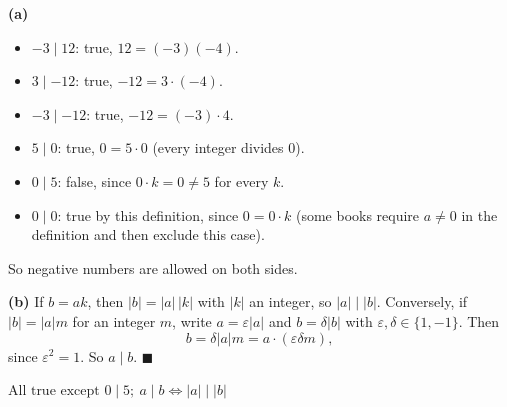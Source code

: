 \textbf{(a)}
\begin{itemize}
\item $-3\mid12$: true, $12=(-3)(-4)$.
\item $3\mid-12$: true, $-12=3\cdot(-4)$.
\item $-3\mid-12$: true, $-12=(-3)\cdot4$.
\item $5\mid0$: true, $0=5\cdot0$ (every integer divides $0$).
\item $0\mid5$: false, since $0\cdot k=0\ne5$ for every $k$.
\item $0\mid0$: true by this definition, since $0=0\cdot k$ (some books require $a\ne0$ in the definition and then exclude this case).
\end{itemize}
So negative numbers are allowed on both sides.

\textbf{(b)} If $b=ak$, then $|b|=|a|\,|k|$ with $|k|$ an integer, so $|a|\mid|b|$. Conversely, if $|b|=|a|m$ for an integer $m$, write $a=\varepsilon|a|$ and $b=\delta|b|$ with $\varepsilon,\delta\in\{1,-1\}$. Then
\[b=\delta|a|m=a\cdot(\varepsilon\delta m),\]
since $\varepsilon^2=1$. So $a\mid b$. $\blacksquare$

$\boxed{\text{All true except }0\mid5;\ a\mid b\iff|a|\mid|b|}$
